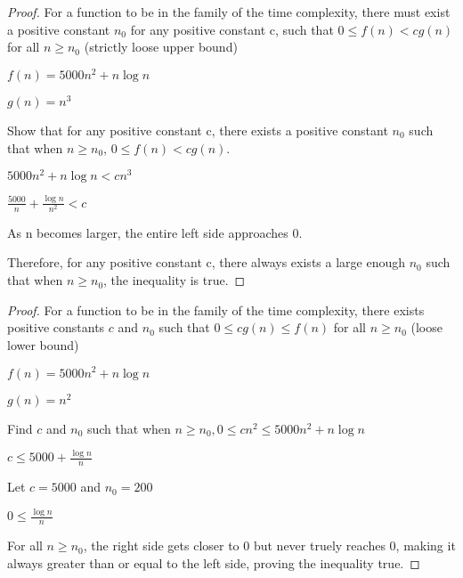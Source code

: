 \documentclass[11pt]{article}
\begin{document}
\bigskip


\begin{proof} For a function to be in the family of the time complexity, there must exist a positive constant $n_0$ for any positive constant c, such that $0\leq f(n)<cg(n)$ for all $n\geq n_0$ (strictly loose upper bound)

$f(n)=5000n^2+n\log n$

$g(n)=n^3$

Show that for any positive constant c, there exists a positive constant $n_0$ such that when $n\geq n_0$, $0\leq f(n)<cg(n)$.

$5000n^2+n\log n<cn^3$

$\frac{5000}{n}+\frac{\log n}{n^2}<c$

As n becomes larger, the entire left side approaches 0.

Therefore, for any positive constant c, there always exists a large enough $n_0$ such that when $n\geq n_0$, the inequality is true.
\end{proof}

\bigskip


\begin{proof} For a function to be in the family of the time complexity, there exists positive constants $c$ and $n_0$ such that $0\leq cg(n)\leq f(n)$ for all $n\geq n_0$ (loose lower bound)

$f(n)=5000n^2+n\log n$

$g(n)=n^2$

Find $c$ and $n_0$ such that when $n\geq n_0, 0\leq cn^2\leq 5000n^2+n\log n$

$c\leq5000+\frac{\log n}{n}$

Let $c=5000$ and $n_0=200$

$0\leq\frac{\log n}{n}$

For all $n\geq n_0$, the right side gets closer to 0 but never truely reaches 0, making it always greater than or equal to the left side, proving the inequality true.

\end{proof}

\bigskip

\end{document}
